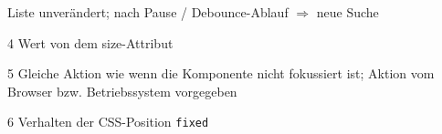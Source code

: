 \begin{table}[!htb]
\begin{adjustbox}{max width=\textwidth}
\begin{threeparttable}
\begin{tablenotes}
                                Liste unverändert; nach Pause / Debounce-Ablauf $\Rightarrow$ neue Suche
                \item[4] Wert von dem size-Attribut
                \item[5] Gleiche Aktion wie wenn die Komponente nicht fokussiert ist; Aktion vom Browser bzw. Betriebssystem vorgegeben
                \item[6] Verhalten der CSS-Position \texttt{fixed}
            \end{tablenotes}
        \end{threeparttable}
    \end{adjustbox}
\end{table}
